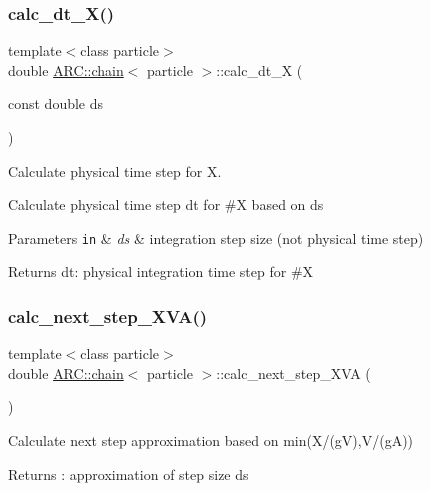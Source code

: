 \subsubsection{\texorpdfstring{calc\+\_\+dt\+\_\+\+X()}{calc\_dt\_X()}}
{\footnotesize\ttfamily template$<$class particle$>$ \\
double \hyperlink{classARC_1_1chain}{A\+R\+C\+::chain}$<$ particle $>$\+::calc\+\_\+dt\+\_\+X (\begin{DoxyParamCaption}\item[{const double}]{ds }\end{DoxyParamCaption})\hspace{0.3cm}{\ttfamily [inline]}}



Calculate physical time step for X. 

Calculate physical time step dt for \#X based on ds 
\begin{DoxyParams}[1]{Parameters}
\mbox{\tt in}  & {\em ds} & integration step size (not physical time step) \\
\hline
\end{DoxyParams}
\begin{DoxyReturn}{Returns}
dt\+: physical integration time step for \#X 
\end{DoxyReturn}
\hypertarget{classARC_1_1chain_a3d0f80ad6952b0e38762465092ed86a6}{}\label{classARC_1_1chain_a3d0f80ad6952b0e38762465092ed86a6} 
\subsubsection{\texorpdfstring{calc\+\_\+next\+\_\+step\+\_\+\+X\+V\+A()}{calc\_next\_step\_XVA()}}
{\footnotesize\ttfamily template$<$class particle$>$ \\
double \hyperlink{classARC_1_1chain}{A\+R\+C\+::chain}$<$ particle $>$\+::calc\+\_\+next\+\_\+step\+\_\+\+X\+VA (\begin{DoxyParamCaption}{ }\end{DoxyParamCaption})\hspace{0.3cm}{\ttfamily [inline]}}



Calculate next step approximation based on min(X/(gV),V/(gA)) 

\begin{DoxyReturn}{Returns}
\+: approximation of step size ds 
\end{DoxyReturn}
\hypertarget{classARC_1_1chain_a68ae268afb418455bfdd6e8101b3b4eb}{}\label{classARC_1_1chain_a68ae268afb418455bfdd6e8101b3b4eb} 

